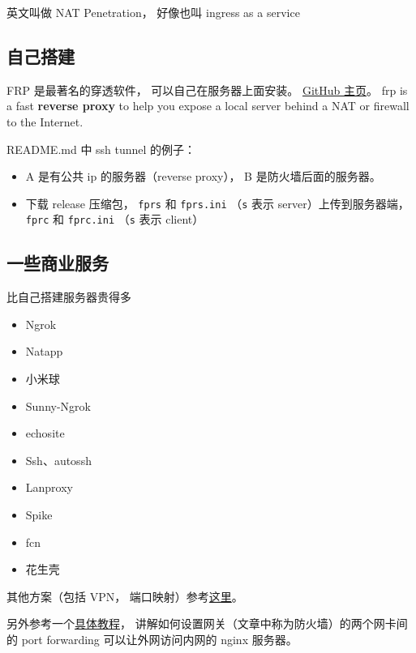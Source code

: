 
\begin{issues}
\issueDraft
\end{issues}

英文叫做 NAT Penetration， 好像也叫 ingress as a service

\subsection{自己搭建}
FRP 是最著名的穿透软件， 可以自己在服务器上面安装。 \href{https://github.com/fatedier/frp}{GitHub 主页}。
frp is a fast \textbf{reverse proxy} to help you expose a local server behind a NAT or firewall to the Internet.

README.md 中 ssh tunnel 的例子：
\begin{itemize}
\item A 是有公共 ip 的服务器（reverse proxy）， B 是防火墙后面的服务器。
\item 下载 release 压缩包， \verb|fprs| 和 \verb|fprs.ini| （\verb|s| 表示 server）上传到服务器端， \verb|fprc| 和 \verb|fprc.ini| （\verb|s| 表示 client）
\end{itemize}

\subsection{一些商业服务}
比自己搭建服务器贵得多
\begin{itemize}
\item Ngrok
\item Natapp
\item 小米球
\item Sunny-Ngrok
\item echosite
\item Ssh、autossh
\item Lanproxy
\item Spike
\item fcn
\item 花生壳
\end{itemize}

其他方案（包括 VPN， 端口映射）参考\href{https://johackim.com/how-to-expose-local-server-behind-firewall}{这里}。

另外参考一个\href{https://www.digitalocean.com/community/tutorials/how-to-forward-ports-through-a-linux-gateway-with-iptables}{具体教程}， 讲解如何设置网关（文章中称为防火墙）的两个网卡间的 port forwarding 可以让外网访问内网的 nginx 服务器。 
